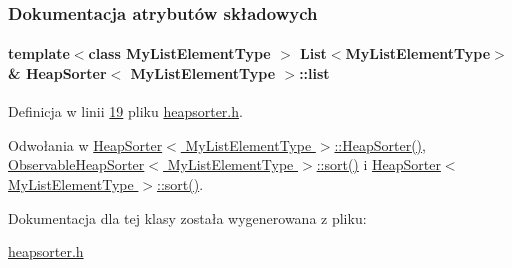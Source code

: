 \subsubsection{Dokumentacja atrybutów składowych}
\hypertarget{class_heap_sorter_a6b8ac615ff2de0c2e510ad215d0508d9}{
\paragraph[{list}]{\setlength{\rightskip}{0pt plus 5cm}template$<$class My\-List\-Element\-Type $>$ {\bf List}$<$My\-List\-Element\-Type$>$\& {\bf Heap\-Sorter}$<$ My\-List\-Element\-Type $>$\-::list}}\label{class_heap_sorter_a6b8ac615ff2de0c2e510ad215d0508d9}


Definicja w linii \hyperlink{heapsorter_8h_source_l00019}{19} pliku \hyperlink{heapsorter_8h_source}{heapsorter.\-h}.



Odwołania w \hyperlink{heapsorter_8h_source_l00021}{Heap\-Sorter$<$ My\-List\-Element\-Type $>$\-::\-Heap\-Sorter()}, \hyperlink{observableheapsorter_8h_source_l00023}{Observable\-Heap\-Sorter$<$ My\-List\-Element\-Type $>$\-::sort()} i \hyperlink{heapsorter_8h_source_l00035}{Heap\-Sorter$<$ My\-List\-Element\-Type $>$\-::sort()}.



Dokumentacja dla tej klasy została wygenerowana z pliku\-:\begin{DoxyCompactItemize}
\item 
\hyperlink{heapsorter_8h}{heapsorter.\-h}\end{DoxyCompactItemize}

